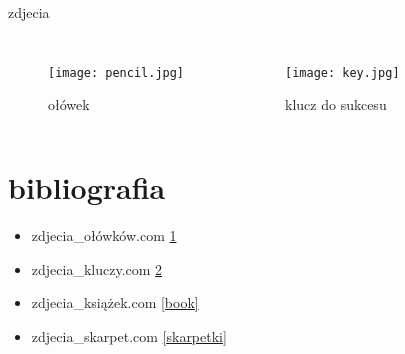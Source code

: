 \documentclass{beamer}
\begin{document}
\begin{frame}{zdjecia}
	\begin{columns}
		\begin{figure}
			\hspace*{-2cm}
			\texttt{[image: pencil.jpg]}
			\caption{ołówek}
   \label{olowek}
		\end{figure}
		
		\begin{figure}
			\hspace*{-1cm}
			\texttt{[image: key.jpg]}
   \label{klucz}
   			\caption{klucz do sukcesu}
			
		\end{figure}
	\end{columns}
\end{frame}



\section{bibliografia}
\begin{itemize}
    \item zdjecia\_ołówków.com \ref{olowek}
    \item zdjecia\_kluczy.com \ref{klucz}
    \item zdjecia\_książek.com \ref{book}
    \item zdjecia\_skarpet.com \ref{skarpetki}
\end{itemize}
\end{document}
